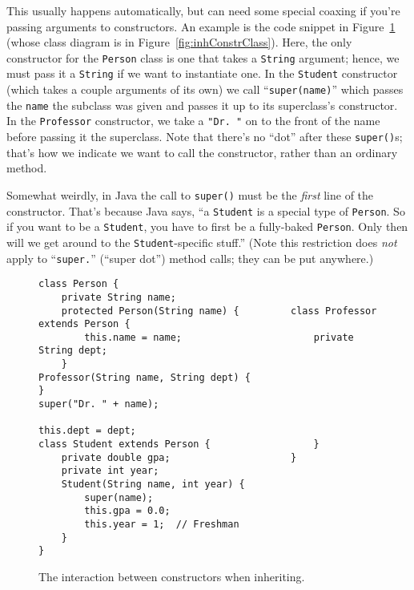 This usually happens automatically, but can need some special coaxing if
you're passing arguments to constructors. An example is the code snippet in
Figure~\ref{fig:inhConstrCode} (whose class diagram is in
Figure~\ref{fig:inhConstrClass}). Here, the only constructor for the
\texttt{Person} class is one that takes a \texttt{String} argument; hence, we
must pass it a \texttt{String} if we want to instantiate one. In the
\texttt{Student} constructor (which takes a couple arguments of its own) we
call ``\texttt{super(name)}'' which passes the \texttt{name} the subclass was
given and passes it up to its superclass's constructor. In the
\texttt{Professor} constructor, we take a \texttt{"Dr.\ "} on to the front of
the name before passing it the superclass. Note that there's no ``dot'' after
these \texttt{super()}s; that's how we indicate we want to call the
constructor, rather than an ordinary method.

Somewhat weirdly, in Java the call to \texttt{super()} must be the
\textit{first} line of the constructor. That's because Java says, ``a
\texttt{Student} is a special type of \texttt{Person}. So if you want to be a
\texttt{Student}, you have to first be a fully-baked \texttt{Person}. Only
then will we get around to the \texttt{Student}-specific stuff.'' (Note this
restriction does \textit{not} apply to ``\texttt{super.}'' (``super dot'')
method calls; they can be put anywhere.)

\begin{figure}[ht]
\begin{Verbatim}[fontsize=\scriptsize,samepage=true,frame=single]
class Person {                    
    private String name;          
    protected Person(String name) {         class Professor extends Person {
        this.name = name;                       private String dept;
    }                                           Professor(String name, String dept) {
}                                                   super("Dr. " + name);
                                                    this.dept = dept;
class Student extends Person {                  }
    private double gpa;                     }
    private int year;
    Student(String name, int year) {
        super(name);
        this.gpa = 0.0;
        this.year = 1;  // Freshman
    }
}
\end{Verbatim}
\caption{The interaction between constructors when inheriting.}
\label{fig:inhConstrCode}
\end{figure}


